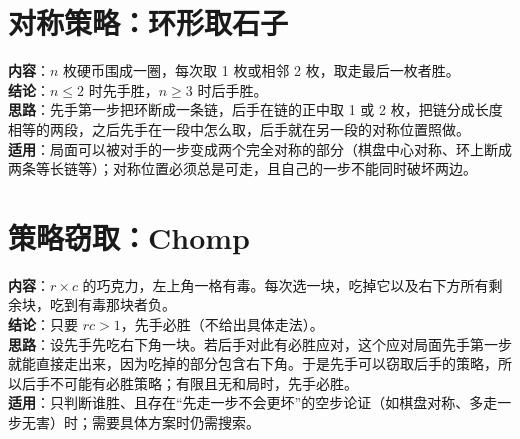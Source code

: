 \section{对称策略：环形取石子}\label{knowledge-game-symmetry}
\textbf{内容}：$n$ 枚硬币围成一圈，每次取 1 枚或相邻 2 枚，取走最后一枚者胜。\\
\textbf{结论}：$n\le2$ 时先手胜，$n\ge3$ 时后手胜。\\
\textbf{思路}：先手第一步把环断成一条链，后手在链的正中取 1 或 2 枚，把链分成长度相等的两段，之后先手在一段中怎么取，后手就在另一段的对称位置照做。\\
\textbf{适用}：局面可以被对手的一步变成两个完全对称的部分（棋盘中心对称、环上断成两条等长链等）；对称位置必须总是可走，且自己的一步不能同时破坏两边。

\section{策略窃取：Chomp}\label{knowledge-game-chomp}
\textbf{内容}：$r\times c$ 的巧克力，左上角一格有毒。每次选一块，吃掉它以及右下方所有剩余块，吃到有毒那块者负。\\
\textbf{结论}：只要 $rc>1$，先手必胜（不给出具体走法）。\\
\textbf{思路}：设先手先吃右下角一块。若后手对此有必胜应对，这个应对局面先手第一步就能直接走出来，因为吃掉的部分包含右下角。于是先手可以窃取后手的策略，所以后手不可能有必胜策略；有限且无和局时，先手必胜。\\
\textbf{适用}：只判断谁胜、且存在“先走一步不会更坏”的空步论证（如棋盘对称、多走一步无害）时；需要具体方案时仍需搜索。
